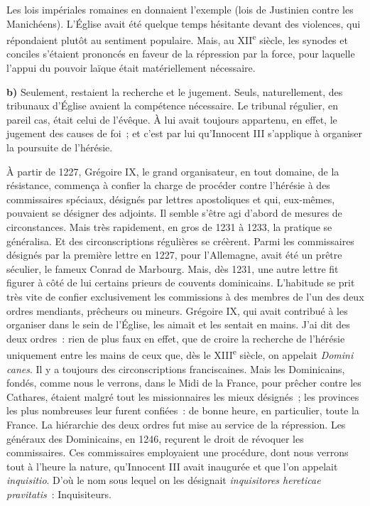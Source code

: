 \documentclass[french,twoside]{book} %
\newcommand{\labelchar}[1]{\textbf{\color{rubric} #1}}
\begin{document}
\noindent Les lois impériales romaines en donnaient l’exemple (lois de Justinien contre les Manichéens). L’Église avait été quelque temps hésitante devant des violences, qui répondaient plutôt au sentiment populaire. Mais, au XII\textsuperscript{e} siècle, les synodes et conciles s’étaient prononcés en faveur de la répression par la force, pour laquelle l’appui du pouvoir laïque était matériellement nécessaire.\par
\bigbreak
\noindent \labelchar{b)} Seulement, restaient la recherche et le jugement. Seuls, naturellement, des tribunaux d’Église avaient la compétence nécessaire. Le tribunal régulier, en pareil cas, était celui de l’évêque. À lui avait toujours appartenu, en effet, le jugement des causes de foi ; et c’est par lui qu’Innocent III s’applique à organiser la poursuite de l’hérésie.\par
À partir de 1227, Grégoire IX, le grand organisateur, en tout domaine, de la résistance, commença à confier la charge de procéder contre l’hérésie à des commissaires spéciaux, désignés par lettres apostoliques et qui, eux-mêmes, pouvaient se désigner des adjoints. Il semble s’être agi d’abord de mesures de circonstances. Mais très rapidement, en gros de 1231 à 1233, la pratique se généralisa. Et des circonscriptions régulières se créèrent. Parmi les commissaires désignés par la première lettre en 1227, pour l’Allemagne, avait été un prêtre séculier, le fameux Conrad de Marbourg. Mais, dès 1231, une autre lettre fit figurer à côté de lui certains prieurs de couvents dominicains. L’habitude se prit très vite de confier exclusivement les commissions à des membres de l’un des deux ordres mendiants, prêcheurs ou mineurs. Grégoire IX, qui avait contribué à les organiser dans le sein de l’Église, les aimait et les sentait en mains. J’ai dit des deux ordres : rien de plus faux en effet, que de croire la recherche de l’hérésie uniquement entre les mains de ceux que,  
\label{p105} dès le XIII\textsuperscript{e} siècle, on appelait \emph{Domini canes}. Il y a toujours des circonscriptions franciscaines. Mais les Dominicains, fondés, comme nous le verrons, dans le Midi de la France, pour prêcher contre les Cathares, étaient malgré tout les missionnaires les mieux désignés ; les provinces les plus nombreuses leur furent confiées : de bonne heure, en particulier, toute la France. La hiérarchie des deux ordres fut mise au service de la répression. Les généraux des Dominicains, en 1246, reçurent le droit de révoquer les commissaires. Ces commissaires employaient une procédure, dont nous verrons tout à l’heure la nature, qu’Innocent III avait inaugurée et que l’on appelait \emph{inquisitio}. D’où le nom sous lequel on les désignait \emph{inquisitores hereticae pravitatis} : Inquisiteurs.\par
\end{document}
